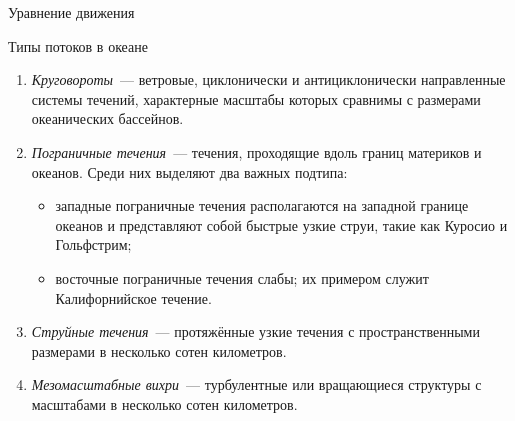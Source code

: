 \begin{chapter}{Уравнение движения}
\begin{section}{Типы потоков в океане}
\begin{enumerate}
\item
\emph{Круговороты}~--- ветровые, циклонически и антициклонически
направленные системы течений, характерные масштабы которых сравнимы с
размерами океанических бассейнов.
%

\item
\emph{Пограничные течения}~--- течения, проходящие 
вдоль границ материков и океанов. Среди них выделяют два важных подтипа: 
%
%
\begin{itemize}
 \item западные пограничные течения располагаются на западной
 границе океанов и представляют собой быстрые узкие струи, такие как
 Куросио и Гольфстрим;
%

 \item восточные пограничные течения слабы; их примером служит Калифорнийское
 течение.
%
\end{itemize}

\item
\emph{Струйные течения}~--- протяжённые узкие течения с
пространственными размерами в несколько сотен километров.
%

\item
\emph{Мезомасштабные вихри}~--- турбулентные или вращающиеся структуры
с масштабами в несколько сотен километров.
%
\end{enumerate}


\end{section}
\end{chapter}
